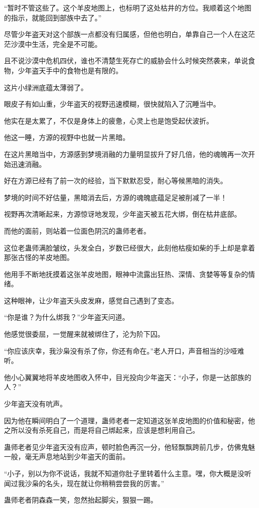 \begin{this_body}
“暂时不管这些了。这个羊皮地图上，也标明了这处枯井的方位。我顺着这个地图的指示，就能回到部族中去了。”

尽管少年盗天对这个部族一点都没有归属感，但他也明白，单靠自己一个人在这茫茫沙漠中生活，完全是不可能。

且不说沙漠中危机四伏，谁也不清楚生死存亡的威胁会什么时候突然袭来，单说食物，少年盗天手中的食物也是有限的。

这片小绿洲底蕴太薄弱了。

眼皮子有如山重，少年盗天的视野迅速模糊，很快就陷入了沉睡当中。

他实在是太累了，不仅是身体上的疲惫，心灵上也是饱受起伏波折。

他这一睡，方源的视野中也就一片黑暗。

在这片黑暗当中，方源感到梦境消融的力量明显拔升了好几倍，他的魂魄再一次开始迅速消融。

好在方源已经有了前一次的经验，当下默默忍受，耐心等候黑暗的消失。

梦境的时间不好估量，黑暗消去后，方源的魂魄底蕴足足被削减了一半！

视野再次清晰起来，方源惊讶地发现，少年盗天被五花大绑，倒在枯井底部。

而他的面前，则站着一位面色阴沉的蛊师老者。

这位老蛊师满脸皱纹，头发全白，岁数已经很大，此刻他枯瘦如柴的手上却是拿着那张古怪的羊皮地图。

他用手不断地抚摸着这张羊皮地图，眼神中流露出狂热、深情、贪婪等等复杂的情绪。

这种眼神，让少年盗天头皮发麻，感觉自己遇到了变态。

“你是谁？为什么绑我？”少年盗天问道。

他感觉很委屈，一觉醒来就被绑住了，沦为阶下囚。

“你应该庆幸，我沙枭没有杀了你，你还有命在。”老人开口，声音相当的沙哑难听。

他小心翼翼地将羊皮地图收入怀中，目光投向少年盗天：“小子，你是一达部族的人？”

少年盗天没有吭声。

因为他在瞬间明白了一个道理，蛊师老者一定知道这张羊皮地图的价值和秘密，他之所以没有杀死自己，而是将自己绑起来，应该是想利用自己。

蛊师老者见少年盗天没有应声，顿时脸色再沉一分，他轻飘飘跨前几步，仿佛鬼魅一般，毫无声息地站到少年盗天的面前。

“小子，别以为你不说话，我就不知道你肚子里转着什么主意。嘿，你大概是没听闻过我沙枭的名头，现在就让你稍稍尝尝我的厉害。”

蛊师老者阴森森一笑，忽然抬起脚尖，狠狠一踢。


\end{this_body}
